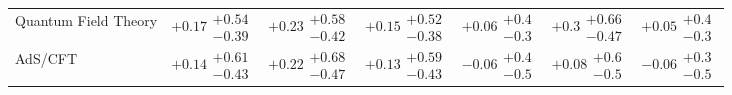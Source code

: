 \begin{table}[H]
\begin{tabular}{lllllll}
Quantum Field Theory & $+0.17\substack{+0.54 \\ -0.39}$ & $+0.23\substack{+0.58 \\ -0.42}$ & $+0.15\substack{+0.52 \\ -0.38}$ & $+0.06\substack{+0.4 \\ -0.3}$ & $+0.3\substack{+0.66 \\ -0.47}$ & $+0.05\substack{+0.4 \\ -0.3}$ \\
AdS/CFT & $+0.14\substack{+0.61 \\ -0.43}$ & $+0.22\substack{+0.68 \\ -0.47}$ & $+0.13\substack{+0.59 \\ -0.43}$ & $-0.06\substack{+0.4 \\ -0.5}$ & $+0.08\substack{+0.6 \\ -0.5}$ & $-0.06\substack{+0.3 \\ -0.5}$ \\
\bottomrule
\end{tabular}\normalsize\renewcommand{\arraystretch}{1}
\end{table}
